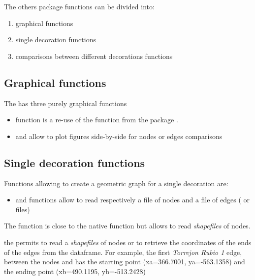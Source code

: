 \documentclass[article]{jss}\usepackage[]{graphicx}\usepackage[]{color}
\begin{document}
The others  package functions can be divided into:
\begin{enumerate}
 \item graphical functions
 \item single decoration functions
 \item comparisons between different decorations functions
\end{enumerate}

\subsection{Graphical functions} \label{sec:functions_gr}

The  has three purely graphical functions
\begin{itemize}
\setlength\itemsep{.1em}
\item {} function is a re-use of the  function from the  package \citep{Snow20}.
\item {} and  allow to plot figures side-by-side for nodes or edges comparisons
\end{itemize}

\subsection{Single decoration functions} \label{sec:functions_one}

Functions allowing to create a geometric graph for a single decoration are:

\begin{itemize}
  \item {} and  functions allow to read respectively a file of nodes and a file of edges ( or  files)
\end{itemize}

The  function is close to the native  function but allows to read \emph{shapefiles} of nodes.

the  permits to read a \emph{shapefiles} of nodes or to retrieve the coordinates of the ends of the edges from the  dataframe. For example, the first \emph{Torrejon Rubio 1} edge, between the nodes  and  has
the starting point (xa=366.7001, ya=-563.1358) and the ending point (xb=490.1195, yb=-513.2428)
\end{document}
